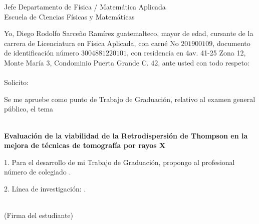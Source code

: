 \begin{titlepage}
%




\begin{flushleft}
Jefe Departamento de Física / Matemática Aplicada \\
Escuela de Ciencias Físicas y Matemáticas \\
\end{flushleft}

\vspace{3.5cm}

Yo, Diego Rodolfo Sarceño Ramírez guatemalteco, mayor de edad, cursante de la carrera de Licenciatura en Física Aplicada, con carné No $201900109$, documento de identificación número $3004 88122 0101$, con residencia en 4av. 41-25 Zona 12, Monte María 3, Condominio Puerta Grande C. 42, ante usted con todo respeto: \\\\

Solicito:

Se me apruebe como punto de Trabajo de Graduación, relativo al examen general público, el tema \\\\

\begin{center}
\textbf{Evaluación de la viabilidad de la Retrodispersión de Thompson en la mejora de técnicas de tomografía por rayos X}
\end{center}

\vspace{2.5cm}

1. Para el desarrollo de mi Trabajo de Graduación, propongo al profesional \underline{\hspace{10cm}} número de colegiado \underline{\hspace{4cm}}.

2. Línea de investigación: \underline{\hspace{10cm}}.

\vspace{0.5cm}

\begin{flushright}
\underline{\hspace{8cm}} \\
(Firma del estudiante)
\end{flushright}






\pagebreak





\end{titlepage}
